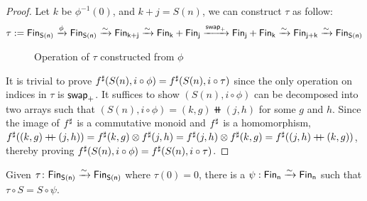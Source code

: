 \begin{proof}
Let $k$ be $\phi^{-1}(0)$, and $k + j = S(n)$, we can construct $\tau$ as follow:
\begin{align*}
    \tau := \Fin[S(n)] \xto{\phi} \Fin[S(n)] \xto{\sim} \Fin[k+j] \xto{\sim} \Fin[k] + \Fin[j]
    \xto{\term{swap}_{+}} \Fin[j] + \Fin[k] \xto{\sim} \Fin[j+k] \xto{\sim} \Fin[S(n)]
\end{align*}

\begin{figure}[H]
    \centering
    \hspace{1em}
    \caption{Operation of $\tau$ constructed from $\phi$}
    \label{fig:enter-label}
\end{figure}

It is trivial to prove ${f}^{\sharp}(S(n), i \circ \phi) = {f}^{\sharp}(S(n), i \circ \tau)$ since the only
operation on indices in $\tau$ is $\operatorname{\mathsf{swap}}_{+}$. It suffices to show $(S(n), i \circ \phi)$
can be decomposed into two arrays such that $(S(n), i \circ \phi) = (k, g) \doubleplus (j, h)$
for some $g$ and $h$. Since the image of ${f}^{\sharp}$ is a commutative monoid and ${f}^{\sharp}$ is a homomorphism,
${f}^{\sharp}((k, g) \mathbin{+\kern -0.4em+} (j, h)) = {f}^{\sharp}(k, g) \otimes {f}^{\sharp}(j, h) = {f}^{\sharp}(j, h) \otimes {f}^{\sharp}(k, g) =
{f}^{\sharp}((j, h) \mathbin{+\kern -0.4em+} (k, g))$, thereby proving ${f}^{\sharp}(S(n), i \circ \phi) = {f}^{\sharp}(S(n), i \circ \tau)$.

\end{proof}


\begin{lemma}\label{bag:punch}
Given $\tau\colon \Fin[S(n)]\xto{\sim}\Fin[S(n)]$ where $\tau(0) = 0$,
there is a $\psi : \Fin[n] \xto{\sim} \Fin[n]$ such that $\tau \circ S = S \circ \psi$.
\end{lemma}

